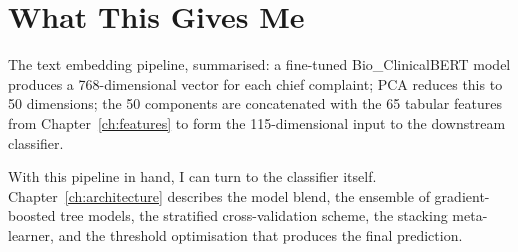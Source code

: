 \section{What This Gives Me}

The text embedding pipeline, summarised: a fine-tuned Bio\_ClinicalBERT model produces a 768-dimensional vector for each chief complaint; PCA reduces this to 50 dimensions; the 50 components are concatenated with the 65 tabular features from Chapter~\ref{ch:features} to form the 115-dimensional input to the downstream classifier.

With this pipeline in hand, I can turn to the classifier itself. Chapter~\ref{ch:architecture} describes the model blend, the ensemble of gradient-boosted tree models, the stratified cross-validation scheme, the stacking meta-learner, and the threshold optimisation that produces the final prediction.
